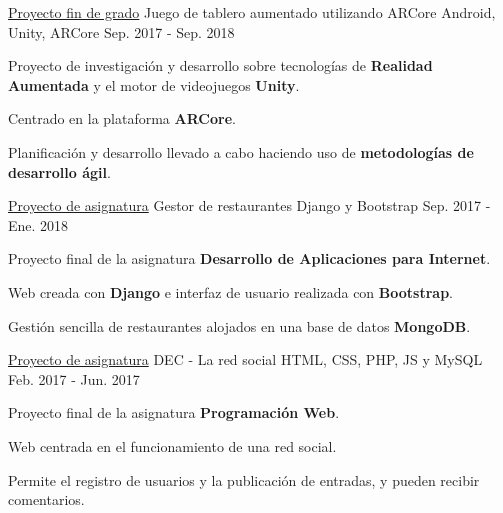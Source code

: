

\begin{cventries}

  \cventry
    {\href{https://github.com/matl1995/TFG}{Proyecto fin de grado}} %
    {Juego de tablero aumentado utilizando ARCore} %
    {Android, Unity, ARCore} %
    {Sep. 2017 - Sep. 2018} %
    {
      \begin{cvitems} %
        \item {Proyecto de investigación y desarrollo sobre tecnologías de \textbf{Realidad Aumentada} y el motor de videojuegos \textbf{Unity}.}
        \item {Centrado en la plataforma \textbf{ARCore}.}
        \item {Planificación y desarrollo llevado a cabo haciendo uso de \textbf{metodologías de desarrollo ágil}.}
      \end{cvitems}
    }

  \cventry
    {\href{https://github.com/matl1995/DAI}{Proyecto de asignatura}} %
    {Gestor de restaurantes} %
    {Django y Bootstrap} %
    {Sep. 2017 - Ene. 2018} %
    {
      \begin{cvitems} %
        \item {Proyecto final de la asignatura \textbf{Desarrollo de Aplicaciones para Internet}.}
        \item {Web creada con \textbf{Django} e interfaz de usuario realizada con \textbf{Bootstrap}.}
        \item {Gestión sencilla de restaurantes alojados en una base de datos \textbf{MongoDB}.}
      \end{cvitems}
    }

  \cventry
    {\href{https://github.com/matl1995/PW}{Proyecto de asignatura}} %
    {DEC - La red social} %
    {HTML, CSS, PHP, JS y MySQL} %
    {Feb. 2017 - Jun. 2017} %
    {
      \begin{cvitems} %
        \item {Proyecto final de la asignatura \textbf{Programación Web}.}
        \item {Web centrada en el funcionamiento de una red social.}
        \item {Permite el registro de usuarios y la publicación de entradas, y pueden recibir comentarios.}
      \end{cvitems}
    }


\end{cventries}
